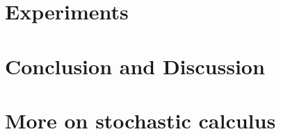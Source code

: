 \documentclass[twoside,11pt]{report}
\begin{document}
\part{Experiments}

    

\part{Conclusion and Discussion}

    

%
%
%
%
\part{More on stochastic calculus}

    
    
    

\begin{appendices}
    
\end{appendices}

\clearpage

\printglossary
\clearpage


\printbibliography
\clearpage
\end{document}
